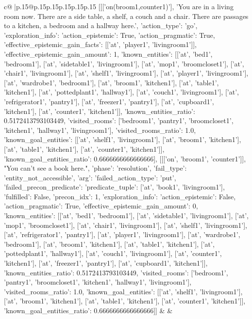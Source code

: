 \documentclass{article}
\begin{document}
{\begin{supertabular}{c@{$\;$}|p{.15\linewidth}@{}p{.15\linewidth}p{.15\linewidth}p{.15\linewidth}p{.15\linewidth}p{.15\linewidth}}
{{{	 [[['on(broom1,counter1)'], 'You are in a living room now. There are a side table, a shelf, a couch and a chair. There are passages to a kitchen, a bedroom and a hallway here.', {'action_type': 'go', 'exploration_info': {'action_epistemic': True, 'action_pragmatic': True, 'effective_epistemic_gain_facts': [['at', 'player1', 'livingroom1']], 'effective_epistemic_gain_amount': 1, 'known_entities': [['at', 'bed1', 'bedroom1'], ['at', 'sidetable1', 'livingroom1'], ['at', 'mop1', 'broomcloset1'], ['at', 'chair1', 'livingroom1'], ['at', 'shelf1', 'livingroom1'], ['at', 'player1', 'livingroom1'], ['at', 'wardrobe1', 'bedroom1'], ['at', 'broom1', 'kitchen1'], ['at', 'table1', 'kitchen1'], ['at', 'pottedplant1', 'hallway1'], ['at', 'couch1', 'livingroom1'], ['at', 'refrigerator1', 'pantry1'], ['at', 'freezer1', 'pantry1'], ['at', 'cupboard1', 'kitchen1'], ['at', 'counter1', 'kitchen1']], 'known_entities_ratio': 0.5172413793103449, 'visited_rooms': ['bedroom1', 'pantry1', 'broomcloset1', 'kitchen1', 'hallway1', 'livingroom1'], 'visited_rooms_ratio': 1.0, 'known_goal_entities': [['at', 'shelf1', 'livingroom1'], ['at', 'broom1', 'kitchen1'], ['at', 'table1', 'kitchen1'], ['at', 'counter1', 'kitchen1']], 'known_goal_entities_ratio': 0.6666666666666666}}], [[['on', 'broom1', 'counter1']], "You can't see a book here.", {'phase': 'resolution', 'fail_type': 'entity_not_accessible', 'arg': {'failed_action_type': 'put', 'failed_precon_predicate': {'predicate_tuple': ['at', 'book1', 'livingroom1'], 'fulfilled': False, 'precon_idx': 1}}, 'exploration_info': {'action_epistemic': False, 'action_pragmatic': True, 'effective_epistemic_gain_amount': 0, 'known_entities': [['at', 'bed1', 'bedroom1'], ['at', 'sidetable1', 'livingroom1'], ['at', 'mop1', 'broomcloset1'], ['at', 'chair1', 'livingroom1'], ['at', 'shelf1', 'livingroom1'], ['at', 'refrigerator1', 'pantry1'], ['at', 'player1', 'livingroom1'], ['at', 'wardrobe1', 'bedroom1'], ['at', 'broom1', 'kitchen1'], ['at', 'table1', 'kitchen1'], ['at', 'pottedplant1', 'hallway1'], ['at', 'couch1', 'livingroom1'], ['at', 'counter1', 'kitchen1'], ['at', 'freezer1', 'pantry1'], ['at', 'cupboard1', 'kitchen1']], 'known_entities_ratio': 0.5172413793103449, 'visited_rooms': ['bedroom1', 'pantry1', 'broomcloset1', 'kitchen1', 'hallway1', 'livingroom1'], 'visited_rooms_ratio': 1.0, 'known_goal_entities': [['at', 'shelf1', 'livingroom1'], ['at', 'broom1', 'kitchen1'], ['at', 'table1', 'kitchen1'], ['at', 'counter1', 'kitchen1']], 'known_goal_entities_ratio': 0.6666666666666666}}]] 
	  } 
	   } 
	   } 
	 & & \\ 
 


\end{supertabular}}
\end{document}
